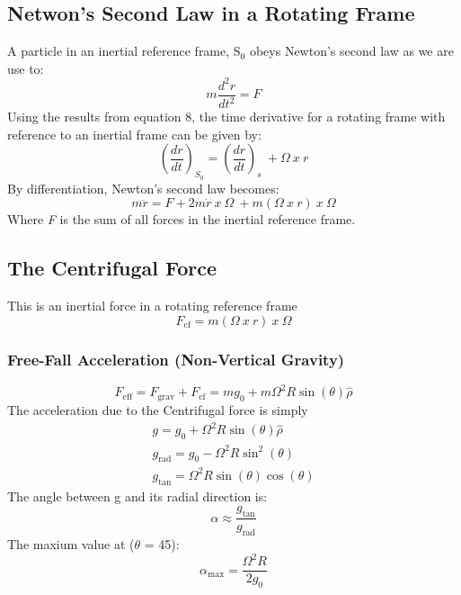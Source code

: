 \documentclass[11pt]{article}
\theoremstyle{definition}
\begin{document}
\subsection{Netwon's Second Law in a Rotating Frame}
A particle in an inertial reference frame, S$_0$ obeys Newton's second law as we are use to:
\begin{equation}
m\frac{d^2r}{dt^2} = F
\end{equation}
Using the results from equation 8, the time derivative for a rotating frame with reference to an inertial frame can be given by:
\begin{equation}
(\frac{dr}{dt})_{S_0} = (\frac{dr}{dt})_s \ + \Omega \ x \ r
\end{equation}
By differentiation, Newton's second law becomes:
\begin{equation}
m\ddot{r} = F + 2m\dot{r} \ x \ \Omega \ + m(\Omega \ x \ r) \ x \ \Omega
\end{equation}
Where \textit{F} is the sum of all forces in the inertial reference frame. 
\subsection{The Centrifugal Force}
This is an inertial force in a rotating reference frame 
\begin{equation}
F_{\text{cf}} = m(\Omega \ x \ r) \ x \ \Omega
\end{equation}
\subsubsection*{Free-Fall Acceleration (Non-Vertical Gravity)}
\begin{equation}
F_{\text{eff}} = F_{\text{grav}} + F_{\text{cf}} = mg_0 + m\Omega^2R\sin(\theta)\hat{\rho}
\end{equation}
The acceleration due to the Centrifugal force is simply 
\begin{equation}
\begin{split}
g = g_0 + \Omega^2R\sin(\theta)\hat{\rho} \\
g_{\text{rad}} = g_0 - \Omega^2R\sin^2(\theta)  \\
g_{\text{tan}} = \Omega^2R\sin(\theta)\cos(\theta)
\end{split}
\end{equation}
The angle between g and its radial direction is:
\begin{equation}
\alpha \approx \frac{g_{\text{tan}}}{g_{\text{rad}}} 
\end{equation}
The maxium value at ($\theta$ = 45):
\begin{equation}
\alpha_{\text{max}} =  \frac{\Omega^2R}{2g_0}
\end{equation}
\end{document}
